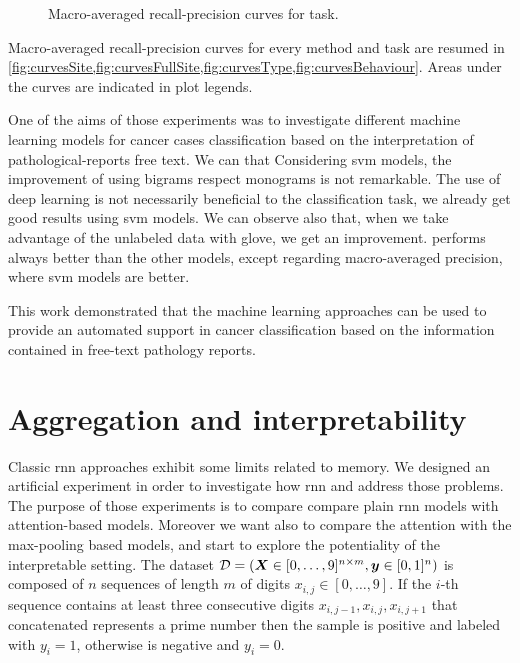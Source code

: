\begin{figure}
  \centering
  \resizebox{0.9\textwidth}{!}{}
  \caption{Macro-averaged recall-precision curves for \behaviour{} task.}
  \label{fig:curvesBehaviour}
\end{figure}

Macro-averaged recall-precision curves for every method and task are
resumed in
\cref{fig:curvesSite,fig:curvesFullSite,fig:curvesType,fig:curvesBehaviour}. Areas
under the curves are indicated in 
plot legends.

One of the aims of those experiments was to investigate different
machine learning 
models for cancer cases classification based on the interpretation
of pathological-reports free text. We can that
Considering \ac{svm} models, the improvement of using
bigrams respect monograms is not remarkable.
The use of deep learning is not necessarily beneficial to the
classification task, we already get good results using \ac{svm}
models. We can observe also that, when we take 
advantage of the unlabeled data with \ac{glove}, we get an
improvement.
\lstmb{} performs always better than the other models, except
regarding macro-averaged precision, where \ac{svm} models are better.

This work demonstrated that the machine learning approaches can be
used to provide an automated support in cancer classification based on
the information contained in free-text pathology reports.

\section{Aggregation and interpretability}
\label{ch:artificial}

Classic \ac{rnn} approaches exhibit some limits related to
memory. We designed an artificial experiment in
order to investigate how \ac{rnn} and \maxp{} address those
problems. The purpose of those experiments is to compare compare plain
\ac{rnn} models with attention-based models. Moreover we want also to
compare the attention with the max-pooling based models, and start to
explore the potentiality of the interpretable setting. The dataset 
$\mathcal{D}=(\bm{X}\in [0,\dots,9]^{n\times m},\bm{y}\in [0,1]^n)$ is
composed of $n$ sequences of length
$m$ of digits $x_{i,j}\in[0,\dots,9]$. If the $i$-th sequence contains
at least three consecutive digits
$x_{i,j-1},x_{i,j},x_{i,j+1}$ that concatenated represents a prime
number then the
sample is positive and labeled with $y_i=1$, otherwise is negative and
$y_i=0$.

